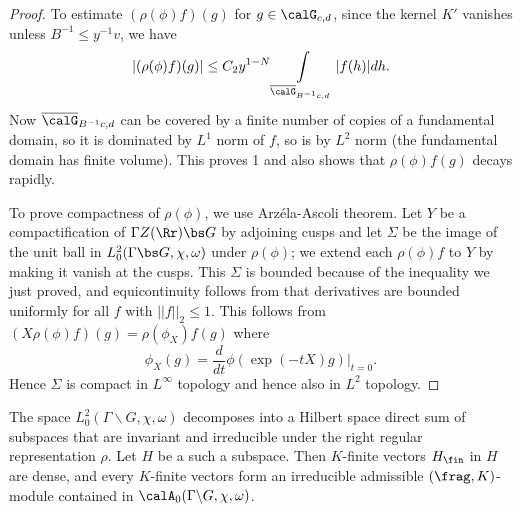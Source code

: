 \begin{proof}
To estimate $(\rho(\phi)f)(g)$ for $g\in \calG_{c, d}$, since the kernel $K'$ vanishes unless $B^{-1}\leq y^{-1}v$, we have 
$$
|(\rho(\phi)f)(g)| \leq C_{2}y^{1-N} \int\limits_{\overline{\calG}_{B^{-1}c, d}}|f(h)| dh. 
$$
Now $\overline{\calG}_{B^{-1}c, d}$ can be covered by a finite number of copies of a fundamental domain, so it is dominated by $L^{1}$ norm of $f$, so is by $L^{2}$ norm (the fundamental domain has finite volume). 
This proves 1 and also shows that $\rho(\phi)f(g)$ decays rapidly. 

To prove compactness of $\rho(\phi)$, we use Arz\'ela-Ascoli theorem. Let $Y$ be a compactification of $\Gamma Z(\Rr) \bs G$ by adjoining cusps and let $\Sigma$ be the image of the unit ball in $L^{2}_{0}(\Gamma\bs G, \chi, \omega)$ under $\rho(\phi)$; we extend each $\rho(\phi)f$ to $Y$ by making it vanish at the cusps. This $\Sigma$ is bounded because of the inequality we just proved, and equicontinuity follows from that derivatives are bounded uniformly for all $f$ with $||f||_{2} \leq 1$. 
This follows from $(X\rho(\phi)f)(g) = \rho(\phi_{X})f(g)$ where 
$$
\phi_{X}(g) = \frac{d}{dt} \phi(\exp (-tX)g)|_{t=0}. 
$$
Hence $\Sigma$ is compact in $L^{\infty}$ topology and hence also in $L^{2}$ topology. 
\end{proof}
\begin{theorem}
\label{cuspdecom}
The space $L_{0}^{2}(\Gamma\backslash G, \chi, \omega)$ decomposes into a Hilbert space direct sum of subspaces that are invariant and irreducible under the right regular representation $\rho$. Let $H$ be a such a subspace. 
Then $K$-finite vectors $H_{\fin}$ in $H$ are dense, and every $K$-finite vectors form an irreducible admissible $(\frag, K)$-module contained in $\calA_{0}(\Gamma\backslash G, \chi, \omega)$. 
\end{theorem}
